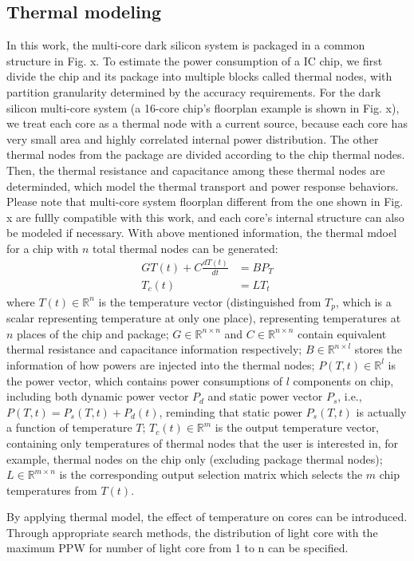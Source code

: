 \subsection{Thermal modeling}
In this work, the multi-core dark silicon system is packaged in a common structure in Fig. x. 
To estimate the power consumption of a IC chip, we first divide the chip and its package into multiple blocks called thermal nodes, with partition granularity determined by the accuracy requirements. For the dark silicon multi-core system (a 16-core chip's floorplan example is shown in Fig. x), we treat each core as a thermal node with a current source, because each core has very small area and highly correlated internal power distribution. The other thermal nodes from the package are divided according to the chip thermal nodes. Then, the thermal resistance and capacitance among these thermal nodes are determinded, which model the thermal transport and power response behaviors. Please note that multi-core system floorplan different from the one shown in Fig. x are fullly compatible with this work, and each core's internal structure can also be modeled if necessary. With above mentioned information, the thermal mdoel for a chip with $n$ total thermal nodes can be generated:
\begin{equation}\label{gt=bp}
\begin{split}
GT(t) + C\frac{dT(t)}{dt} &= BP_{T}\\
T_{c}(t) &= LT_{t}
\end{split}
\end{equation}
where $T(t) \in \mathbb{R}^n$ is the temperature vector (distinguished from $T_p$, which is a scalar representing temperature at only one place), representing temperatures at $n$ places of the chip and package; $G \in \mathbb{R}^{n\times n}$ and  $C \in \mathbb{R}^{n \times n}$ contain equivalent thermal resistance and capacitance information respectively; $B \in \mathbb{R}^{n \times l}$ stores the information of how powers are injected into the thermal nodes; $P(T, t) \in \mathbb{R}^{l}$ is the power vector, which contains power consumptions of $l$ components on chip, including both dynamic power vector $P_d$ and static power vector $P_s$, i.e., $P(T, t)=P_s(T, t)+P_d(t)$, reminding that static power $P_s(T, t)$ is actually a function of temperature $T$;  $T_{c}(t) \in \mathbb{R}^m$ is the output temperature vector, containing only temperatures of thermal nodes that the user is interested in, for example, thermal nodes on the chip only (excluding package thermal nodes); $L \in \mathbb{R}^{m \times n}$ is the corresponding output selection matrix which selects the $m$ chip temperatures from $T(t)$.

By applying thermal model, the effect of temperature on cores can be introduced. Through appropriate search methods, the distribution of light core with the maximum PPW for number of light core from 1 to n can be specified.



